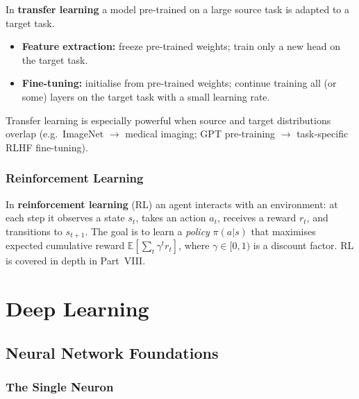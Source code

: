\documentclass[oneside]{book}
\begin{document}
In \textbf{transfer learning} a model pre-trained on a large source task is
adapted to a target task.

\begin{itemize}
  \item \textbf{Feature extraction:} freeze pre-trained weights; train only
        a new head on the target task.
  \item \textbf{Fine-tuning:} initialise from pre-trained weights; continue
        training all (or some) layers on the target task with a small
        learning rate.
\end{itemize}

Transfer learning is especially powerful when source and target distributions
overlap (e.g.\ ImageNet $\to$ medical imaging; GPT pre-training $\to$
task-specific RLHF fine-tuning).

\section{Reinforcement Learning}

In \textbf{reinforcement learning} (RL) an agent interacts with an
environment: at each step it observes a state $s_t$, takes an action $a_t$,
receives a reward $r_t$, and transitions to $s_{t+1}$.  The goal is to
learn a \emph{policy} $\pi(a|s)$ that maximises expected cumulative reward
$\mathbb{E}[\sum_t \gamma^t r_t]$, where $\gamma\in[0,1)$ is a discount
factor.  RL is covered in depth in Part~VIII.


\part{Deep Learning}

\chapter{Neural Network Foundations}

\section{The Single Neuron}
\end{document}
